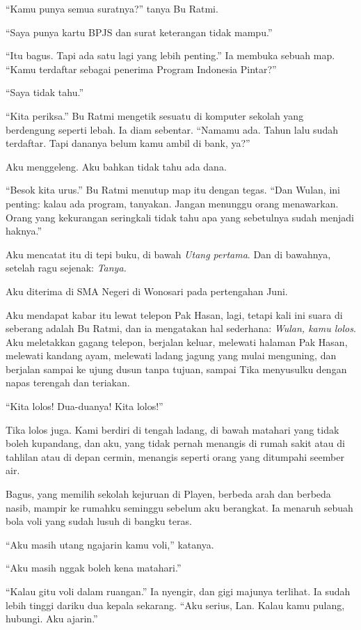 \documentclass[11pt,twoside,openany]{book}
\makeatletter
\newcommand{\scenebreak}{\par\vspace{0.9em}{\centering\textsc{*\hspace{0.7em}*\hspace{0.7em}*}\par}\vspace{0.9em}\@afterindentfalse\@afterheading}
\makeatother
\begin{document}
``Kamu punya semua suratnya?'' tanya Bu Ratmi.

``Saya punya kartu BPJS dan surat keterangan tidak mampu.''

``Itu bagus. Tapi ada satu lagi yang lebih penting.'' Ia membuka sebuah map. ``Kamu terdaftar sebagai penerima Program Indonesia Pintar?''

``Saya tidak tahu.''

``Kita periksa.'' Bu Ratmi mengetik sesuatu di komputer sekolah yang berdengung seperti lebah. Ia diam sebentar. ``Namamu ada. Tahun lalu sudah terdaftar. Tapi dananya belum kamu ambil di bank, ya?''

Aku menggeleng. Aku bahkan tidak tahu ada dana.

``Besok kita urus.'' Bu Ratmi menutup map itu dengan tegas. ``Dan Wulan, ini penting: kalau ada program, tanyakan. Jangan menunggu orang menawarkan. Orang yang kekurangan seringkali tidak tahu apa yang sebetulnya sudah menjadi haknya.''

Aku mencatat itu di tepi buku, di bawah \emph{Utang pertama}. Dan di bawahnya, setelah ragu sejenak: \emph{Tanya.}

\scenebreak
Aku diterima di SMA Negeri di Wonosari pada pertengahan Juni.

Aku mendapat kabar itu lewat telepon Pak Hasan, lagi, tetapi kali ini suara di seberang adalah Bu Ratmi, dan ia mengatakan hal sederhana: \emph{Wulan, kamu lolos}. Aku meletakkan gagang telepon, berjalan keluar, melewati halaman Pak Hasan, melewati kandang ayam, melewati ladang jagung yang mulai menguning, dan berjalan sampai ke ujung dusun tanpa tujuan, sampai Tika menyusulku dengan napas terengah dan teriakan.

``Kita lolos! Dua-duanya! Kita lolos!''

Tika lolos juga. Kami berdiri di tengah ladang, di bawah matahari yang tidak boleh kupandang, dan aku, yang tidak pernah menangis di rumah sakit atau di tahlilan atau di depan cermin, menangis seperti orang yang ditumpahi seember air.

Bagus, yang memilih sekolah kejuruan di Playen, berbeda arah dan berbeda nasib, mampir ke rumahku seminggu sebelum aku berangkat. Ia menaruh sebuah bola voli yang sudah lusuh di bangku teras.

``Aku masih utang ngajarin kamu voli,'' katanya.

``Aku masih nggak boleh kena matahari.''

``Kalau gitu voli dalam ruangan.'' Ia nyengir, dan gigi majunya terlihat. Ia sudah lebih tinggi dariku dua kepala sekarang. ``Aku serius, Lan. Kalau kamu pulang, hubungi. Aku ajarin.''
\end{document}
